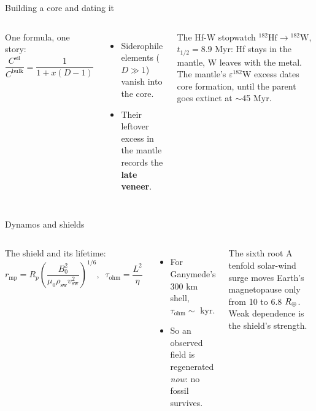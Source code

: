 \documentclass[aspectratio=169, 11pt]{beamer}
\begin{document}
\begin{frame}{Building a core and dating it}
  \begin{columns}[T]
    One formula, one story:
    \[
      \frac{C^\mathrm{sil}}{C^\mathrm{bulk}} = \frac{1}{1 + x(D-1)}
    \]
    \begin{itemize}
      \item Siderophile elements ($D \gg 1$) vanish into the core.
      \item Their leftover excess in the mantle records the \textbf{late veneer}.
    \end{itemize}

    \begin{block}{The Hf-W stopwatch}
      ${}^{182}\mathrm{Hf} \to {}^{182}\mathrm{W}$, $t_{1/2} = 8.9$ Myr: Hf stays in the mantle, W leaves with the metal. The mantle's $\varepsilon^{182}\mathrm{W}$ excess dates core formation, until the parent goes extinct at $\sim$45 Myr.
    \end{block}
  \end{columns}
  \vskip2pt\relax
\end{frame}

\begin{frame}{Dynamos and shields}
  \begin{columns}[T]
    \small
    The shield and its lifetime:
    \[
      \boxed{r_\mathrm{mp} = R_p\left(\frac{B_0^2}{\mu_0 \rho_\mathrm{sw} v_\mathrm{sw}^2}\right)^{1/6}},
      \;\;
      \tau_\mathrm{ohm} = \frac{L^2}{\eta}
    \]
    \begin{itemize}\setlength\itemsep{1pt}
      \item For Ganymede's 300 km shell, $\tau_\mathrm{ohm} \sim$ kyr.
      \item So an observed field is regenerated \emph{now}: no fossil survives.
    \end{itemize}

    \begin{block}{The sixth root}
      \small
      A tenfold solar-wind surge moves Earth's magnetopause only from 10 to 6.8 $R_{\oplus}$. Weak dependence is the shield's strength.
    \end{block}
  \end{columns}
  \vskip2pt\relax
\end{frame}
\end{document}
